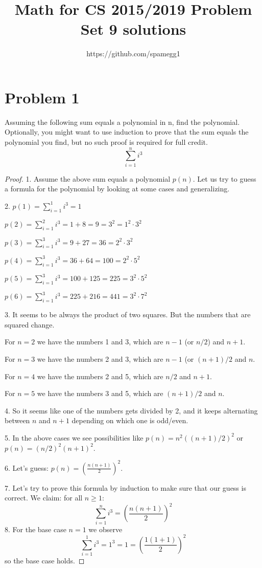 \documentclass[14pt]{extarticle}
\title{Math for CS 2015/2019 Problem Set 9 solutions}
\author{https://github.com/spamegg1}
\begin{document}
\maketitle
\tableofcontents

\section{Problem 1}
Assuming the following sum equals a polynomial in n, find the polynomial. Optionally, you might want to use induction to prove that the sum equals the polynomial you find, but no such proof is required for full credit.
$$
\sum_{i = 1}^{n}i^3
$$
\begin{proof}
1. Assume the above sum equals a polynomial $p(n)$. Let us try to guess a formula for the polynomial by looking at some cases and generalizing.

2. $p(1) = \sum_{i = 1}^{1}i^3 = 1$

$p(2) = \sum_{i = 1}^{2}i^3 = 1 + 8 = 9 = 3^2 = 1^2 \cdot 3^2$

$p(3) = \sum_{i = 1}^{3}i^3 = 9 + 27 = 36 = 2^2\cdot 3^2$

$p(4) = \sum_{i = 1}^{3}i^3 = 36 + 64 = 100 = 2^2\cdot 5^2$

$p(5) = \sum_{i = 1}^{3}i^3 = 100 + 125 = 225 = 3^2\cdot 5^2$

$p(6) = \sum_{i = 1}^{3}i^3 = 225 + 216 = 441 = 3^2\cdot 7^2$

3. It seems to be always the product of two squares. But the numbers that are squared change.

For $n = 2$ we have the numbers 1 and 3, which are $n-1$ (or $n/2$) and $n+1$.

For $n = 3$ we have the numbers 2 and 3, which are $n-1$ (or $(n+1)/2$ and $n$.

For $n = 4$ we have the numbers 2 and 5, which are $n/2$ and $n + 1$.

For $n = 5$ we have the numbers 3 and 5, which are $(n+1)/2$ and $n$.

4. So it seems like one of the numbers gets divided by 2, and it keeps alternating between $n$ and $n+1$ depending on which one is odd/even.

5. In the above cases we see possibilities like $p(n) = n^2((n+1)/2)^2$ or $p(n) = (n/2)^2(n+1)^2$.

6. Let's guess: $\displaystyle p(n) = \left(\frac{n(n+1)}{2}\right)^2$.

7. Let's try to prove this formula by induction to make sure that our guess is correct. We claim: for all $n \geq 1$:
$$
\sum_{i = 1}^{n}i^3 = \left(\frac{n(n+1)}{2}\right)^2
$$
8. For the base case $n = 1$ we observe
$$
\sum_{i = 1}^{1}i^3 = 1^3 = 1 = \left(\frac{1(1+1)}{2}\right)^2
$$
so the base case holds.


\end{proof}
\end{document}
